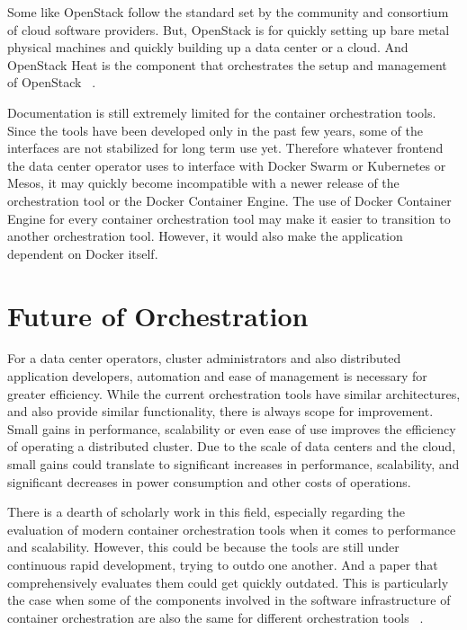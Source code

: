 \documentclass[10pt,twocolumn]{article}
\begin{document}
Some like OpenStack follow the standard set by the community and consortium of cloud software providers.
But, OpenStack is for quickly setting up bare metal physical machines and quickly building up a data center or a cloud.
And OpenStack Heat is the component that orchestrates the setup and management of OpenStack ~\cite{openstack}.

Documentation is still extremely limited for the container orchestration tools.
Since the tools have been developed only in the past few years, some of the interfaces are not stabilized for long term use yet.
Therefore whatever frontend the data center operator uses to interface with Docker Swarm or Kubernetes or Mesos, it may quickly become incompatible with a newer release of the orchestration tool or the Docker Container Engine.
The use of Docker Container Engine for every container orchestration tool may make it easier to transition to another orchestration tool.
However, it would also make the application dependent on Docker itself.

\section{Future of Orchestration}

For a data center operators, cluster administrators and also distributed application developers, automation and ease of management is necessary for greater efficiency.
While the current orchestration tools have similar architectures, and also provide similar functionality, there is always scope for improvement.
Small gains in performance, scalability or even ease of use improves the efficiency of operating a distributed cluster.
Due to the scale of data centers and the cloud, small gains could translate to significant increases in performance, scalability, and significant decreases in power consumption and other costs of operations.

There is a dearth of scholarly work in this field, especially regarding the evaluation of modern container orchestration tools when it comes to performance and scalability.
However, this could be because the tools are still under continuous rapid development, trying to outdo one another.
And a paper that comprehensively evaluates them could get quickly outdated.
This is particularly the case when some of the components involved in the software infrastructure of container orchestration are also the same for different orchestration tools ~\cite{intro_docker}.
\end{document}
